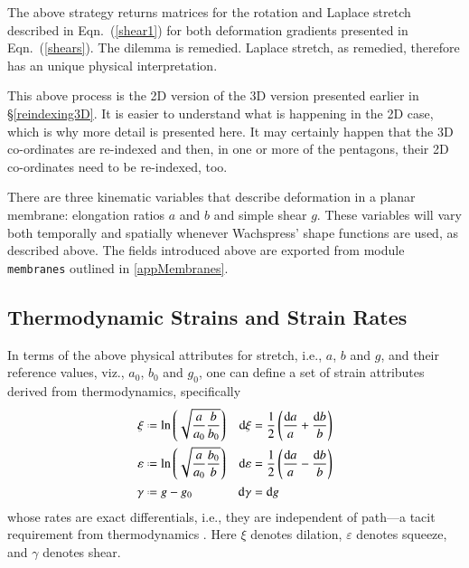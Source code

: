 The above strategy returns matrices for the rotation and Laplace stretch described in Eqn.~(\ref{shear1}) for both deformation gradients presented in Eqn.~(\ref{shears}). The dilemma is remedied.  Laplace stretch, as remedied, therefore has an unique physical interpretation.  

This above process is the 2D version of the 3D version presented earlier in \S\ref{reindexing3D}.  It is easier to understand what is happening in the 2D case, which is why more detail is presented here.  It may certainly happen that the 3D co-ordinates are re-indexed and then, in one or more of the pentagons, their 2D co-ordinates need to be re-indexed, too.

There are three kinematic variables that describe deformation in a planar membrane: elongation ratios $a$ and $b$ and simple shear $g$.  These variables will vary both temporally and spatially whenever Wachspress' shape functions are used, as described above.  The fields introduced above are exported from module \texttt{membranes} outlined in \ref{appMembranes}.

\subsection{Thermodynamic Strains and Strain Rates}

In terms of the above physical attributes for stretch, i.e., $a$, $b$ and $g$, and their reference values, viz., $a_0$, $b_0$ and $g_0$, one can define a set of strain attributes derived from thermo\-dynamics, specifically \cite{Freed17}
\begin{subequations}
    \label{thermodynamicStrains2D}
    \begin{align}
    \xi & \defeq \ln \left( \sqrt{\frac{a}{a_0} \frac{b}{b_0}} \right) & 
    \mathrm{d} \xi & = \frac{1}{2} \left( \frac{\mathrm{d}a}{a} + 
    \frac{\mathrm{d}b}{b} \right) \\
    \varepsilon & \defeq \ln \left( \sqrt{\frac{a}{a_0} \frac{b_0}{b}} \right) &
    \mathrm{d} \varepsilon & = \frac{1}{2} \left( \frac{\mathrm{d}a}{a} - 
    \frac{\mathrm{d}b}{b} \right) \\
    \gamma & \defeq g - g_0 & 
    \mathrm{d} \gamma & = \mathrm{d} g
    \end{align}
\end{subequations}
whose rates are exact differentials, i.e., they are independent of path---a tacit requirement from thermo\-dynamics \cite{Caratheodory09}.  Here $\xi$ denotes dilation, $\varepsilon$ denotes squeeze, and $\gamma$ denotes shear. 

